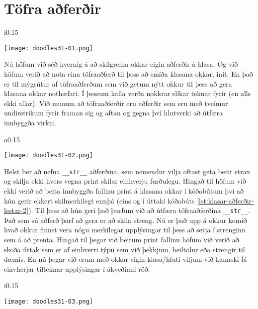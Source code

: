 \section{Töfra aðferðir}\label{uk:klasar-töfra-aðferðir}
\begin{wrapfigure}{i}{0.15\textwidth} %
\begin{center}
	\texttt{[image: doodles31-01.png]}
\end{center}
\end{wrapfigure}
Nú höfum við séð hvernig á að skilgreina okkar eigin aðferðir á klasa.
Og við höfum verið að nota eina töfraaðferð til þess að smíða klasana okkar, init.
En það er til mýgrútur af töfraaðferðum sem við getum nýtt okkur til þess að gera klasana okkar nothæfari.
Í þessum kafla verða nokkrar slíkar teknar fyrir (en alls ekki allar).
Við munum að töfraaðferðir eru aðferðir sem eru með tveimur undirstrikum fyrir framan sig og aftan og gegna því hlutverki að útfæra innbyggða virkni.
\phantom{}
\begin{wrapfigure}{o}{0.15\textwidth} %
	\begin{center}
		\texttt{[image: doodles31-02.png]}
	\end{center}
\end{wrapfigure}

\vspace{10pt}

Helst ber að nefna \texttt{\_\_str\_\_} aðferðina, sem nemendur vilja oftast geta beitt strax og skilja ekki hvers vegna print skilar einhverju furðulegu.
Hingað til höfum við ekki verið að beita innbyggða fallinu print á klasana okkar í kóðabútum því að hún gerir ekkert skilmerkilegt ennþá (eins og í úttaki kóðabúts \ref{lst:klasar-aðferðir-lestar-2}).
Til þess að hún geri það þurfum við að útfæra töfraaðferðina \texttt{\_\_str\_\_}.
Það sem sú aðferð þarf að gera er að skila streng.
Nú er það upp á okkur komið hvað okkur finnst vera nógu merkilegar upplýsingar til þess að setja í strenginn sem á að prenta.
Hingað til þegar við beitum print fallinu höfum við verið að skoða úttak sem er af einhverri týpu sem við þekkjum, heiltölur eða strengir til dæmis.
En nú þegar við erum með okkar eigin klasa/hluti viljum við kannski fá einvherjar tilteknar upplýsingar í ákveðinni röð.


\begin{wrapfigure}{i}{0.15\textwidth} %
	\begin{center}
		\texttt{[image: doodles31-03.png]}
	\end{center}
\end{wrapfigure}

